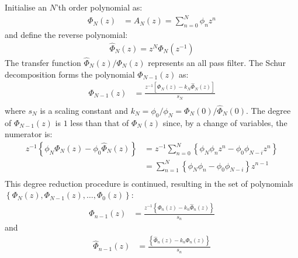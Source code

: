 \documentclass[a4paper,twoside,10pt,english]{article}
\begin{document}
Initialise an $N$'th order polynomial as:
\begin{align*}
  \Phi_{N}\left(z\right) &= A_{N}\left(z\right) = \sum_{n=0}^{N}\phi_{n}z^{n}
\end{align*}
and define the reverse polynomial:
\begin{align*}
\hat{\Phi}_{N}\left(z\right)=z^{N}\Phi_{N}\left(z^{-1}\right)
\end{align*}
The transfer function $\hat{\Phi}_{N}\left(z\right)/\Phi_{N}\left(z\right)$ 
represents an all pass filter.
The Schur decomposition forms the polynomial $\Phi_{N-1}\left(z\right)$ as:
\begin{align*}
  \Phi_{N-1}\left(z\right) &= \frac{z^{-1}\left[\Phi_{N}\left(z\right)-
                             k_{N}\hat{\Phi}_{N}\left(z\right)\right]}
                             {s_{N}} \\
\end{align*}
where $s_{N}$ is a scaling constant and
$k_{N}=\phi_{0}/\phi_{N}=\Phi_{N}\left(0\right)/\hat{\Phi}_{N}\left(0\right)$.
The degree of $\Phi_{N-1}\left(z\right)$ is $1$ less than that of
$\Phi_{N}\left(z\right)$ since, by a change of variables, the numerator is:
\begin{align*}
 z^{-1}\left\{ \phi_{N}\Phi_{N}\left(z\right)-\phi_{0}\hat{\Phi}_{N}\left(z\right)\right\}
& = z^{-1}\sum^{N}_{n=0}\left\{\phi_{N}\phi_{n}z^{n}-\phi_{0}\phi_{N-i}z^{n}\right\}\\
& = \sum^{N}_{n=1}\left\{\phi_{N}\phi_{n}-\phi_{0}\phi_{N-i}\right\}z^{n-1}\\
\end{align*}
This degree reduction procedure is continued, resulting in the set of
polynomials $\left\{\Phi_{N}\left(z\right),\Phi_{N-1}\left(z\right),\ldots,
 \Phi_{0}\left(z\right)\right\}$:
\begin{align}
  \Phi_{n-1}\left(z\right) &= \frac{z^{-1}\left\{\Phi_{n}\left(z\right)-
                             k_{n}\hat{\Phi}_{n}\left(z\right)\right\}}
                             {s_{n}}
\label{eq:SchurDegreeReduction}
\end{align}
and
\begin{align*}
  \hat{\Phi}_{n-1}\left(z\right) &= \frac{\left\{\hat{\Phi}_{n}\left(z\right)-
                                         k_{n}\Phi_{n}\left(z\right)\right\}}
                                        {s_{n}}
\end{align*}
\end{document}
